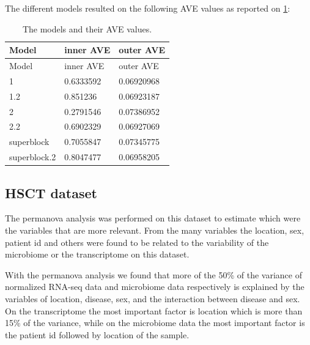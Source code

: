 \documentclass[
  a4paper,
]{book}
\begin{document}
The different models resulted on the following AVE values as reported on \ref{tab:puget-models-ave}:

\begin{longtable}[]{@{}lll@{}}
\caption{\label{tab:puget-models-ave} The models and their AVE values.}\tabularnewline
\toprule
Model & inner AVE & outer AVE \\
\midrule
\endfirsthead
\toprule
Model & inner AVE & outer AVE \\
\midrule
\endhead
1 & 0.6333592 & 0.06920968 \\
1.2 & 0.851236 & 0.06923187 \\
2 & 0.2791546 & 0.07386952 \\
2.2 & 0.6902329 & 0.06927069 \\
superblock & 0.7055847 & 0.07345775 \\
superblock.2 & 0.8047477 & 0.06958205 \\
\bottomrule
\end{longtable}

\hypertarget{results-hsct}{%
\subsection{HSCT dataset}\label{results-hsct}}

The permanova analysis was performed on this dataset to estimate which were the variables that are more relevant.
From the many variables the location, sex, patient id and others were found to be related to the variability of the microbiome or the transcriptome on this dataset.

With the permanova analysis we found that more of the 50\% of the variance of normalized RNA-seq data and microbiome data respectively is explained by the variables of location, disease, sex, and the interaction between disease and sex.
On the transcriptome the most important factor is location which is more than 15\% of the variance, while on the microbiome data the most important factor is the patient id followed by location of the sample.
\end{document}
